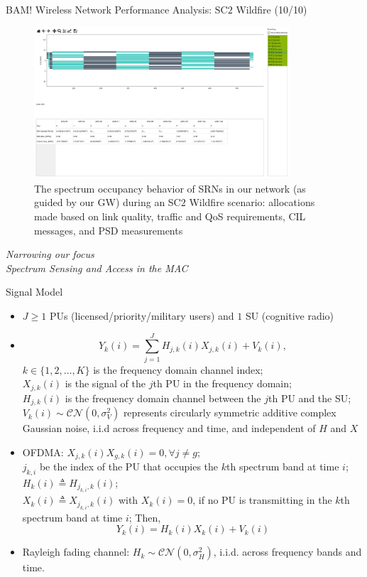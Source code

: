 \documentclass{beamer}
\begin{document}
\begin{frame}{BAM! Wireless Network Performance Analysis: SC$2$ Wildfire (10/10)}
\begin{figure}
    \centering
    \includegraphics[width = 0.85\textwidth]{Wildfire_Channel_Alloc.PNG}
    \caption{The spectrum occupancy behavior of SRNs in our network (as guided by our GW) during an SC$2$ Wildfire scenario: allocations made based on link quality, traffic and QoS requirements, CIL messages, and PSD measurements}
    \label{fig:28}
\end{figure}
\end{frame}
\begin{frame}{}
  \centering \Huge
  \emph{Narrowing our focus\\
        \LARGE{Spectrum Sensing and Access in the MAC}}
\end{frame}
\begin{frame}{Signal Model}
    \footnotesize{\begin{itemize}
        \item $J{\geq}1$ PUs (licensed/priority/military users) and $1$ SU (cognitive radio)
        \item \[Y_k(i) = \sum_{j=1}^{J} H_{j,k}(i)X_{j,k}(i) + V_k(i),\]
        $k {\in} \{1,2,\dots,K\}$ is the frequency domain channel index;
        \\$X_{j,k}(i)$ is the signal of the $j$th PU in the frequency domain;
        \\$H_{j,k}(i)$ is the frequency domain channel between the $j$th PU and the SU; 
        \\$V_k(i) {\sim} \mathcal{CN}(0,\sigma_V^2)$ represents circularly symmetric additive complex Gaussian noise, i.i.d across frequency and time, and independent of $H$ and $X$
        \item OFDMA: $X_{j,k}(i)X_{g,k}(i){=}0, \forall j{\neq}g$;
        \\$j_{k,i}$ be the index of the PU that occupies the $k$th spectrum band at time $i$; \\$H_{k}(i){\triangleq}H_{j_{k,i},k}(i)$; 
        \\$X_{k}(i){\triangleq}X_{j_{k,i},k}(i)$ with $X_{k}(i){=}0$, if no PU is transmitting in the $k$th spectrum band at time $i$; Then,
        \[Y_k(i) = H_{k}(i)X_{k}(i) + V_k(i)\]
        \item Rayleigh fading channel: $H_k {\sim} \mathcal{CN}(0,\sigma_H^2)$, i.i.d. across frequency bands and time.
    \end{itemize}}
\end{frame}
\end{document}
